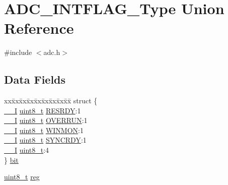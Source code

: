 \hypertarget{union_a_d_c___i_n_t_f_l_a_g___type}{}\section{A\+D\+C\+\_\+\+I\+N\+T\+F\+L\+A\+G\+\_\+\+Type Union Reference}
\label{union_a_d_c___i_n_t_f_l_a_g___type}


{\ttfamily \#include $<$adc.\+h$>$}

\subsection*{Data Fields}
\begin{DoxyCompactItemize}
\item 
\begin{tabbing}
xx\=xx\=xx\=xx\=xx\=xx\=xx\=xx\=xx\=\kill
struct \{\\
\>\mbox{\hyperlink{core__cm0plus_8h_af63697ed9952cc71e1225efe205f6cd3}{\_\_I}} \mbox{\hyperlink{union_a_d_c___i_n_t_f_l_a_g___type_a5b4208c6f4c4a4290c4f2804d1eb1d5b}{uint8\_t}} \mbox{\hyperlink{union_a_d_c___i_n_t_f_l_a_g___type_a9ec027487d3721be7f9ba572b68ef298}{RESRDY}}:1\\
\>\mbox{\hyperlink{core__cm0plus_8h_af63697ed9952cc71e1225efe205f6cd3}{\_\_I}} \mbox{\hyperlink{union_a_d_c___i_n_t_f_l_a_g___type_a5b4208c6f4c4a4290c4f2804d1eb1d5b}{uint8\_t}} \mbox{\hyperlink{union_a_d_c___i_n_t_f_l_a_g___type_a45fbafb248fda764e17929e95d11b4e6}{OVERRUN}}:1\\
\>\mbox{\hyperlink{core__cm0plus_8h_af63697ed9952cc71e1225efe205f6cd3}{\_\_I}} \mbox{\hyperlink{union_a_d_c___i_n_t_f_l_a_g___type_a5b4208c6f4c4a4290c4f2804d1eb1d5b}{uint8\_t}} \mbox{\hyperlink{union_a_d_c___i_n_t_f_l_a_g___type_abb342555b4de142cf8d3064427f4a1a9}{WINMON}}:1\\
\>\mbox{\hyperlink{core__cm0plus_8h_af63697ed9952cc71e1225efe205f6cd3}{\_\_I}} \mbox{\hyperlink{union_a_d_c___i_n_t_f_l_a_g___type_a5b4208c6f4c4a4290c4f2804d1eb1d5b}{uint8\_t}} \mbox{\hyperlink{union_a_d_c___i_n_t_f_l_a_g___type_ae8a10cfa0bb63130ae1e8150943d680b}{SYNCRDY}}:1\\
\>\mbox{\hyperlink{core__cm0plus_8h_af63697ed9952cc71e1225efe205f6cd3}{\_\_I}} \mbox{\hyperlink{union_a_d_c___i_n_t_f_l_a_g___type_a5b4208c6f4c4a4290c4f2804d1eb1d5b}{uint8\_t}}:4\\
\} \mbox{\hyperlink{union_a_d_c___i_n_t_f_l_a_g___type_aaafaee0f01a6be5d0f6f5da331c065ca}{bit}}\\

\end{tabbing}\item 
\mbox{\hyperlink{union_a_d_c___i_n_t_f_l_a_g___type_a5b4208c6f4c4a4290c4f2804d1eb1d5b}{uint8\+\_\+t}} \mbox{\hyperlink{union_a_d_c___i_n_t_f_l_a_g___type_a9428adc9af4653a2050e2536b55dec8d}{reg}}
\end{DoxyCompactItemize}


